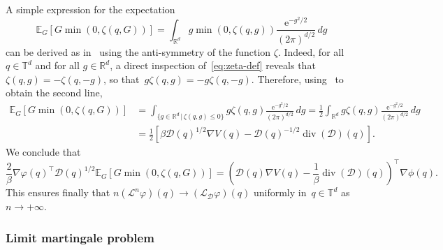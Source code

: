\documentclass{article}
\newcommand{\cL}{\mathcal{L}}
\newcommand{\R}{\mathbb{R}}
\renewcommand{\leq}{\leqslant}
\def\R{\mathbb{R}}
\def\T{\mathbb{T}}
\def\E{\mathbb{E}} %
\newcommand{\Diff}{\mathcal{D}}
\renewcommand{\dim}{d}
\newcommand{\cLD}{\cL_\Diff}
\begin{document}
A simple expression for the expectation
\[
\E_G[G\min\left(0,\zeta(q,G)\right)] = \int_{\R^\dim}g\min\left(0,\zeta(q,g)\right)\frac{\mathrm{e}^{-g^2/2}}{(2\pi)^{\dim/2}} \, dg
\]
can be derived as in~\cite{FS17} using the anti-symmetry of the function $\zeta$. Indeed, for all $q\in\T^\dim$ and for all $g\in\R^\dim$, a direct inspection of~\eqref{eq:zeta-def} reveals that~$\zeta(q,g) = -\zeta(q,-g)$, so that~$g\zeta(q,g) = -g\zeta(q,-g)$. Therefore, using~\cite[Lemma~10]{FS17} to obtain the second line,
\[
\begin{aligned}
  \E_G[G\min\left(0,\zeta(q,G)\right)] & = \int_{\{g\in\R^d \, | \, \zeta(q,g)\leq 0\}} g\zeta(q,g)\frac{\mathrm{e}^{-g^2/2}}{(2\pi)^{\dim/2}} \, dg =  \frac{1}{2}\int_{\R^\dim}g\zeta(q,g)\frac{\mathrm{e}^{-g^2/2}}{(2\pi)^{\dim/2}}\, dg \\
  & = \frac12 \left[ \beta \Diff(q)^{1/2}\nabla V(q) -\Diff(q)^{-1/2}\operatorname{div}(\Diff)(q) \right].
\end{aligned}
\]
We conclude that
\begin{equation}
  \label{eq:term-I}
  \frac2\beta \nabla\varphi(q)^\top\Diff(q)^{1/2}\E_G[G\min\left(0,\zeta(q,G)\right)] =  \left(\Diff(q)\nabla V(q) - \frac{1}{\beta}\operatorname{div}(\Diff)(q)\right)^\top \nabla\phi(q).
\end{equation}
This ensures finally that $n(\mathcal{L}^n\varphi)(q) \to (\cLD\varphi)(q)$ uniformly in~$q \in \T^\dim$ as~$n\to +\infty$.

\subsubsection{Limit martingale problem}
\label{sec:limit_martingale_pbm}

\end{document}
